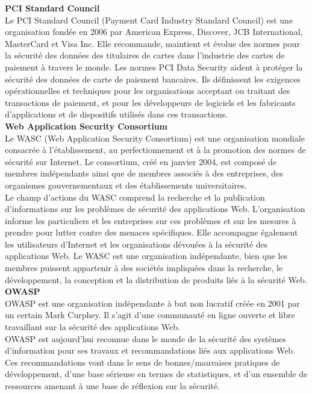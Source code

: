 \textbf{\RIGHTarrow PCI Standard Council}\\
Le PCI Standard Council (Payment Card Industry Standard Council)  est une organisation fondée en 2006 par American Express, Discover, JCB International, MasterCard et Visa Inc. Elle recommande, maintient et évolue des normes pour la sécurité des données des titulaires de cartes dans l'industrie des cartes de paiement à travers le monde. Les normes PCI Data Security aident à protéger la sécurité des données de carte de paiement bancaires. Ils définissent les exigences opérationnelles et techniques pour les organisations acceptant ou traitant des transactions de paiement, et pour les développeurs de logiciels et les fabricants d'applications et de dispositifs utilisés dans ces transactions.\\

\textbf{\RIGHTarrow Web Application Security Consortium}\\
Le WASC (Web Application Security Consortium)  est une organisation mondiale consacrée à l'établissement, au perfectionnement et à la promotion des normes de sécurité sur Internet. Le consortium, créé en janvier 2004, est composé de membres indépendants ainsi que de membres associés à des entreprises, des organismes gouvernementaux et des établissements universitaires.\\
Le champ d'actions du WASC comprend la recherche et la publication d'informations sur les problèmes de sécurité des applications Web. L’organisation informe les particuliers et les entreprises sur ces problèmes et sur les mesures à prendre pour lutter contre des menaces spécifiques. Elle accompagne également les utilisateurs d’Internet et les organisations dévouées à la sécurité des applications Web. Le WASC est une organisation indépendante, bien que les membres puissent appartenir à des sociétés impliquées dans la recherche, le développement, la conception et la distribution de produits liés à la sécurité Web.\\

\textbf{\RIGHTarrow OWASP}\\
OWASP est une organisation indépendante à but non lucratif créée en 2001 par un certain Mark Curphey. Il s'agit d'une communauté en ligne ouverte et libre travaillant sur la sécurité des applications Web.\\
OWASP est aujourd'hui reconnue dans le monde de la sécurité des systèmes d'information pour ses travaux et recommandations liés aux applications Web. Ces recommandations vont dans le sens de bonnes/mauvaises pratiques de développement, d’une base sérieuse en termes de statistiques, et d’un ensemble de ressources amenant à une base de réflexion sur la sécurité.\\

